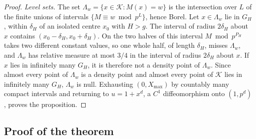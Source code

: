 \documentclass[11pt]{article}
\begin{document}
\begin{proof}
\emph{Level sets.} The set $\Lambda_w=\{x\in\mathcal K:M(x)=w\}$ is the intersection over $L$ of the
finite unions of intervals $\{M\equiv w\bmod p^L\}$, hence Borel. Let $x\in\Lambda_w$ lie in $G_H$, within
$\delta_H$ of an isolated centre $x_0$ with $H>g$. The interval of radius $2\delta_H$ about $x$ contains
$(x_0-\delta_H,x_0+\delta_H)$. On the two halves of this interval $M\bmod p^{P_H}$ takes two different
constant values, so one whole half, of length $\delta_H$, misses $\Lambda_w$, and $\Lambda_w$ has relative
measure at most $3/4$ in the interval of radius $2\delta_H$ about $x$. If $x$ lies in infinitely many
$G_H$, it is therefore not a density point of $\Lambda_w$. Since almost every point of $\Lambda_w$ is a
density point and almost every point of $\mathcal K$ lies in infinitely many $G_H$, $\Lambda_w$ is null.
Exhausting $(0,X_{\max})$ by countably many compact intervals and returning to $u=1+x^d$, a $C^1$
diffeomorphism onto $(1,p^d)$, proves the proposition.
\end{proof}

\subsection{Proof of the theorem}
\end{document}
